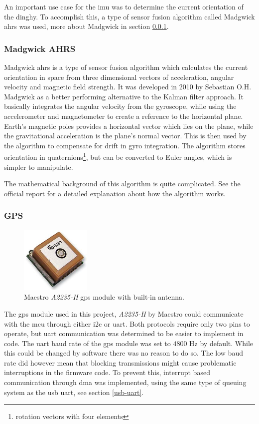 An important use case for the \gls{imu} was to determine the current orientation of the dinghy. To accomplish this, a type of sensor fusion algorithm called Madgwick \gls{ahrs} was used, more about Madgwick in section \ref{sec:madgwick}.

\subsubsection{Madgwick AHRS}
\label{sec:madgwick}
Madgwick \gls{ahrs} is a type of sensor fusion algorithm which calculates the current orientation in space from three dimensional vectors of acceleration, angular velocity and magnetic field strength. It was developed in 2010 by Sebastian O.H. Madgwick as a better performing alternative to the Kalman filter approach\cite{madgwick}. It basically integrates the angular velocity from the gyroscope, while using the accelerometer and magnetometer to create a reference to the horizontal plane. Earth’s magnetic poles provides a horizontal vector which lies on the plane, while the gravitational acceleration is the plane’s normal vector. This is then used by the algorithm to compensate for drift in gyro integration. The algorithm stores orientation in quaternions\footnote{rotation vectors with four elements}, but can be converted to Euler angles, which is simpler to manipulate.

The mathematical background of this algorithm is quite complicated. See the official report\cite{madgwick-report} for a detailed explanation about how the algorithm works.

\subsubsection{GPS}
\begin{figure}[H]
\centering
\includegraphics[width=0.3\textwidth]{Figures/A2235-H.jpg}
\caption{Maestro \emph{A2235-H} \gls{gps} module with built-in antenna.}
\label{gps-figure}
\end{figure}
The \gls{gps} module used in this project, \emph{A2235-H} by Maestro \cite{gps} could communicate with the \gls{mcu} through either \gls{i2c} or \gls{uart}. Both protocols require only two pins to operate, but \gls{uart} communication was determined to be easier to implement in code. The \gls{uart} baud rate of the \gls{gps} module was set to $4800$ Hz by default. While this could be changed by software there was no reason to do so. The low baud rate did however mean that blocking transmissions might cause problematic interruptions in the firmware code. To prevent this, interrupt based communication through \gls{dma} was implemented, using the same type of queuing system as the \gls{usb} \gls{uart}, see section \ref{usb-uart}.

